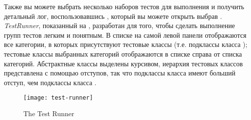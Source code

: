 \documentclass[a4paper,10pt,twoside]{book}
\begin{document}
Также вы можете выбрать несколько наборов тестов для выполнения
и получить детальный лог, воспользовавшись \sunit {},
который вы можете открыть выбрав .
\emph{TestRunner}, показанный на , разработан для того,
чтобы сделать выполнение групп тестов легким и понятным.
В списке на самой левой панели отображаются все категории, в которых присутствуют тестовые классы
(т.е. подклассы класса );
тестовые классы выбранных категорий отображаются в списке справа от списка категорий.
Абстрактные классы выделены курсивом, иерархия тестовых классов представлена с помощью отступов,
так что подклассы класса  имеют больший отступ, чем подклассы класса . 

\begin{figure}[tbh]
  \begin{center}
	\texttt{[image: test-runner]}
	\caption{The \pharo \sunit Test Runner}
  \end{center}
\end{figure}



\end{document}
